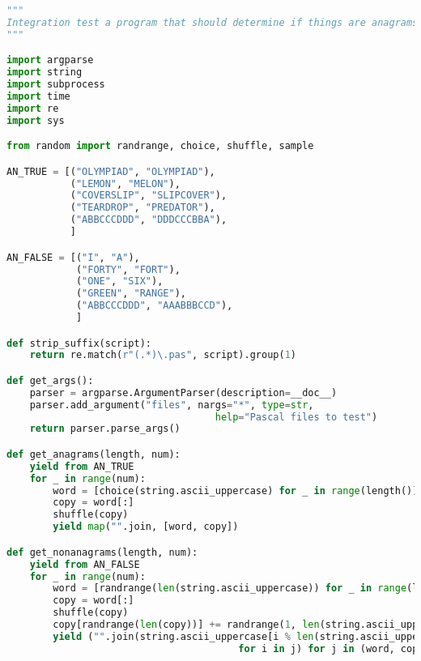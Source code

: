 \documentclass[fleqn,a4paper,11pt]{article}
\begin{document}
\begin{lstlisting}[language=Python, caption=Testing script]
"""
Integration test a program that should determine if things are anagrams
"""

import argparse
import string
import subprocess
import time
import re
import sys

from random import randrange, choice, shuffle, sample

AN_TRUE = [("OLYMPIAD", "OLYMPIAD"),
           ("LEMON", "MELON"),
           ("COVERSLIP", "SLIPCOVER"),
           ("TEARDROP", "PREDATOR"),
           ("ABBCCCDDD", "DDDCCCBBA"),
           ]

AN_FALSE = [("I", "A"),
            ("FORTY", "FORT"),
            ("ONE", "SIX"),
            ("GREEN", "RANGE"),
            ("ABBCCCDDD", "AAABBBCCD"),
            ]

def strip_suffix(script):
    return re.match(r"(.*)\.pas", script).group(1)

def get_args():
    parser = argparse.ArgumentParser(description=__doc__)
    parser.add_argument("files", nargs="*", type=str,
                                    help="Pascal files to test")
    return parser.parse_args()

def get_anagrams(length, num):
    yield from AN_TRUE
    for _ in range(num):
        word = [choice(string.ascii_uppercase) for _ in range(length())]
        copy = word[:]
        shuffle(copy)
        yield map("".join, [word, copy])

def get_nonanagrams(length, num):
    yield from AN_FALSE
    for _ in range(num):
        word = [randrange(len(string.ascii_uppercase)) for _ in range(length())]
        copy = word[:]
        shuffle(copy)
        copy[randrange(len(copy))] += randrange(1, len(string.ascii_uppercase))
        yield ("".join(string.ascii_uppercase[i % len(string.ascii_uppercase)]
                                        for i in j) for j in (word, copy))


\end{lstlisting}
\end{document}
